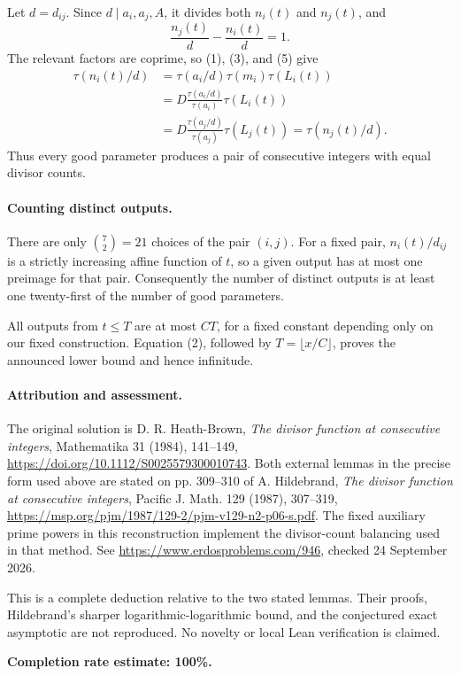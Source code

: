 Let \(d=d_{ij}\). Since \(d\mid a_i,a_j,A\), it divides both \(n_i(t)\) and \(n_j(t)\), and
\[
 \frac{n_j(t)}d-\frac{n_i(t)}d=1.
\]
The relevant factors are coprime, so (1), (3), and (5) give
\[
 \begin{aligned}
 \tau(n_i(t)/d)
 &=\tau(a_i/d)\tau(m_i)\tau(L_i(t))\\
 &=D\frac{\tau(a_i/d)}{\tau(a_i)}\tau(L_i(t))\\
 &=D\frac{\tau(a_j/d)}{\tau(a_j)}\tau(L_j(t))
 =\tau(n_j(t)/d).
 \end{aligned}
\]
Thus every good parameter produces a pair of consecutive integers with equal divisor counts.

\paragraph{Counting distinct outputs.}
There are only \(\binom72=21\) choices of the pair \((i,j)\). For a fixed pair, \(n_i(t)/d_{ij}\) is a strictly increasing affine function of \(t\), so a given output has at most one preimage for that pair. Consequently the number of distinct outputs is at least one twenty-first of the number of good parameters.

All outputs from \(t\leq T\) are at most \(CT\), for a fixed constant depending only on our fixed construction. Equation (2), followed by \(T=\lfloor x/C\rfloor\), proves the announced lower bound and hence infinitude.

\paragraph{Attribution and assessment.}
The original solution is D. R. Heath-Brown, \emph{The divisor function at consecutive integers}, Mathematika 31 (1984), 141--149, \url{https://doi.org/10.1112/S0025579300010743}. Both external lemmas in the precise form used above are stated on pp. 309--310 of A. Hildebrand, \emph{The divisor function at consecutive integers}, Pacific J. Math. 129 (1987), 307--319, \url{https://msp.org/pjm/1987/129-2/pjm-v129-n2-p06-s.pdf}. The fixed auxiliary prime powers in this reconstruction implement the divisor-count balancing used in that method. See \url{https://www.erdosproblems.com/946}, checked 24 September 2026.

This is a complete deduction relative to the two stated lemmas. Their proofs, Hildebrand's sharper logarithmic-logarithmic bound, and the conjectured exact asymptotic are not reproduced. No novelty or local Lean verification is claimed.

\textbf{Completion rate estimate: 100\%.}
